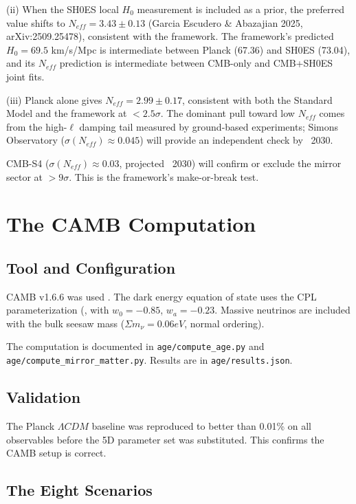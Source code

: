 \documentclass[aps,prd,preprint,superscriptaddress,longbibliography]{revtex4-2}
\begin{document}
(ii) When the SH0ES local $H_{0}$ measurement is included as a prior, the preferred value shifts to $N_{eff} = 3.43 \pm 0.13$ (Garcia Escudero \& Abazajian 2025, arXiv:2509.25478), consistent with the framework. The framework's predicted $H_{0} = 69.5$ km/s/Mpc is intermediate between Planck (67.36) and SH0ES (73.04), and its $N_{eff}$ prediction is intermediate between CMB-only and CMB+SH0ES joint fits.

(iii) Planck alone gives $N_{eff} = 2.99 \pm 0.17$, consistent with both the Standard Model and the framework at $< 2.5\sigma$. The dominant pull toward low $N_{eff}$ comes from the high-$\ell$ damping tail measured by ground-based experiments; Simons Observatory ($\sigma(N_{eff}) \approx 0.045$) will provide an independent check by ~2030.

CMB-S4 ($\sigma(N_{eff}) \approx 0.03$, projected ~2030) will confirm or exclude the mirror sector at $> 9\sigma$. This is the framework's make-or-break test.



\section{The CAMB Computation}


\subsection{Tool and Configuration}

CAMB v1.6.6 was used \cite{LewisChallinorLasenby2000}. The dark energy equation of state uses the CPL parameterization (\cite{ChevallierPolarski2001}, \cite{Linder2003} with $w_{0} = -0.85$, $w_a = -0.23$. Massive neutrinos are included with the bulk seesaw mass ($\Sigma m_\nu = 0.06 eV$, normal ordering).

The computation is documented in \texttt{age/compute\_age.py} and \texttt{age/compute\_mirror\_matter.py}. Results are in \texttt{age/results.json}.


\subsection{Validation}

The Planck $\Lambda CDM$ baseline was reproduced to better than 0.01\% on all observables before the 5D parameter set was substituted. This confirms the CAMB setup is correct.


\subsection{The Eight Scenarios}
\end{document}

